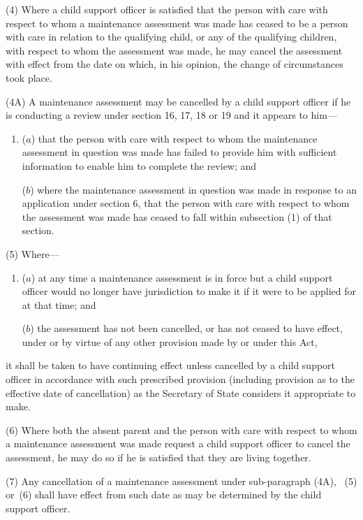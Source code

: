 \documentclass[12pt,a4paper]{article}
\begin{document}
(4) Where a child support officer is satisfied that the person with care with respect to whom a maintenance assessment was made has ceased to be a person with care in relation to the qualifying child, or any of the qualifying children, with respect to whom the assessment was made, he may cancel the assessment with effect from the date on which, in his opinion, the change of circumstances took place.

(4A) A maintenance assessment may be cancelled by a child support officer if he is conducting a review under section 16, 17, 18 or 19 and it appears to him—
\begin{enumerate}\item[]
($a$) that the person with care with respect to whom the maintenance assessment in question was made has failed to provide him with sufficient information to enable him to complete the review; and

($b$) where the maintenance assessment in question was made in response to an application under section 6, that the person with care with respect to whom the assessment was made has ceased to fall within subsection (1) of that section.
\end{enumerate}

(5) Where—
\begin{enumerate}\item[]
($a$) at any time a maintenance assessment is in force but a child support officer would no longer have jurisdiction to make it if it were to be applied for at that time; and

($b$) the assessment has not been cancelled, or has not ceased to have effect, under or by virtue of any other provision made by or under this Act,
\end{enumerate}
it shall be taken to have continuing effect unless cancelled by a child support officer in accordance with such prescribed provision (including provision as to the effective date of cancellation) as the Secretary of State considers it appropriate to make.

(6) Where both the absent parent and the person with care with respect to whom a maintenance assessment was made request a child support officer to cancel the assessment, he may do so if he is satisfied that they are living together.

(7) Any cancellation of a maintenance assessment under sub-paragraph 
(4A),~%
(5)  or~(6)  shall have effect from such date as may be determined by the child support officer.
\end{document}
